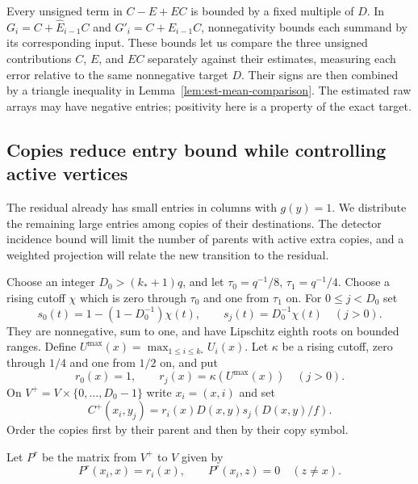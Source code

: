 Every unsigned term in $C-E+EC$ is bounded by a fixed multiple of $D$.
In $G_i=C+\widehat E_{i-1}C$ and $G'_i=C+E_{i-1}C$, nonnegativity
bounds each summand by its corresponding input.
These bounds let us compare the three unsigned contributions
$C$, $E$, and $EC$ separately against their estimates, measuring each
error relative to the same nonnegative target $D$.  Their signs are
then combined by a triangle inequality in
Lemma~\ref{lem:est-mean-comparison}.  The estimated raw arrays may have
negative entries; positivity here is a property of the exact target.

\subsection{Copies reduce entry bound while controlling active vertices}

The residual already has small entries in columns with $g(y)=1$.
We distribute the remaining large entries among copies of their
destinations.  The detector incidence bound will limit the number of
parents with active extra copies, and a weighted projection will relate
the new transition to the residual.

Choose an integer $D_0>(k_*+1)q$, and let
$\tau_0=q^{-1}/8$, $\tau_1=q^{-1}/4$.
Choose a rising cutoff $\chi$ which is zero through $\tau_0$ and one
from $\tau_1$ on.  For $0\leq j<D_0$ set
\begin{equation}
 s_0(t)=1-(1-D_0^{-1})\chi(t),\qquad
 s_j(t)=D_0^{-1}\chi(t)\quad(j>0).
 \label{eq:hier-routing-fractions}
\end{equation}
They are nonnegative, sum to one, and have Lipschitz eighth roots on
bounded ranges.  Define $U^{\max}(x)=\max_{1\leq i\leq k_*}U_i(x)$.
Let $\kappa$ be a rising cutoff, zero through $1/4$ and one from
$1/2$ on, and put
\begin{equation}
 r_0(x)=1,\qquad r_j(x)=\kappa(U^{\max}(x))\quad(j>0).
 \label{eq:hier-copy-row-factors}
\end{equation}
On $V^+=V\times\{0,\ldots,D_0-1\}$ write $x_i=(x,i)$ and set
\begin{equation}
 C^+(x_i,y_j)=r_i(x)D(x,y)s_j(D(x,y)/f).
 \label{eq:hier-copy-transition}
\end{equation}
Order the copies first by their parent and then by their copy symbol.

Let $P^r$ be the matrix from $V^+$ to $V$ given by
\begin{equation}
 P^r(x_i,x)=r_i(x),\qquad P^r(x_i,z)=0\quad(z\ne x).
 \label{eq:hier-projection}
\end{equation}

